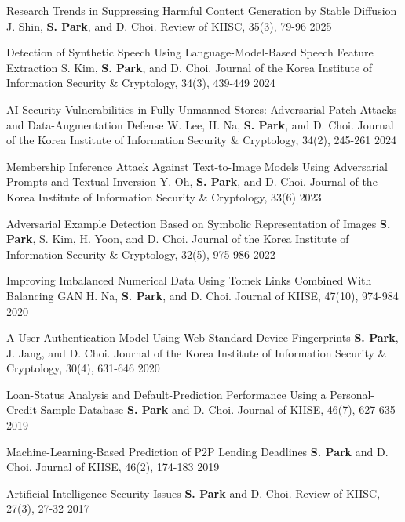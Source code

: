 \begin{cvhonors}
  \cvhonor
    {Research Trends in Suppressing Harmful Content Generation by Stable Diffusion}
    {J. Shin, \textbf{S. Park}, and D. Choi. Review of KIISC, 35(3), 79-96}
    {}
    {2025}

  \cvhonor
    {Detection of Synthetic Speech Using Language-Model-Based Speech Feature Extraction}
    {S. Kim, \textbf{S. Park}, and D. Choi. Journal of the Korea Institute of Information Security \& Cryptology, 34(3), 439-449}
    {}
    {2024}

  \cvhonor
    {AI Security Vulnerabilities in Fully Unmanned Stores: Adversarial Patch Attacks and Data-Augmentation Defense}
    {W. Lee, H. Na, \textbf{S. Park}, and D. Choi. Journal of the Korea Institute of Information Security \& Cryptology, 34(2), 245-261}
    {}
    {2024}

  \cvhonor
    {Membership Inference Attack Against Text-to-Image Models Using Adversarial Prompts and Textual Inversion}
    {Y. Oh, \textbf{S. Park}, and D. Choi. Journal of the Korea Institute of Information Security \& Cryptology, 33(6)}
    {}
    {2023}

  \cvhonor
    {Adversarial Example Detection Based on Symbolic Representation of Images}
    {\textbf{S. Park}, S. Kim, H. Yoon, and D. Choi. Journal of the Korea Institute of Information Security \& Cryptology, 32(5), 975-986}
    {}
    {2022}

  \cvhonor
    {Improving Imbalanced Numerical Data Using Tomek Links Combined With Balancing GAN}
    {H. Na, \textbf{S. Park}, and D. Choi. Journal of KIISE, 47(10), 974-984}
    {}
    {2020}

  \cvhonor
    {A User Authentication Model Using Web-Standard Device Fingerprints}
    {\textbf{S. Park}, J. Jang, and D. Choi. Journal of the Korea Institute of Information Security \& Cryptology, 30(4), 631-646}
    {}
    {2020}

  \cvhonor
    {Loan-Status Analysis and Default-Prediction Performance Using a Personal-Credit Sample Database}
    {\textbf{S. Park} and D. Choi. Journal of KIISE, 46(7), 627-635}
    {}
    {2019}

  \cvhonor
    {Machine-Learning-Based Prediction of P2P Lending Deadlines}
    {\textbf{S. Park} and D. Choi. Journal of KIISE, 46(2), 174-183}
    {}
    {2019}

  \cvhonor
    {Artificial Intelligence Security Issues}
    {\textbf{S. Park} and D. Choi. Review of KIISC, 27(3), 27-32}
    {}
    {2017}
\end{cvhonors}

